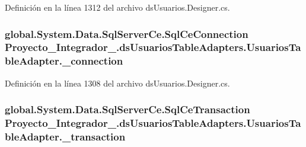 Definición en la línea 1312 del archivo ds\-Usuarios.\-Designer.\-cs.

\hypertarget{class_proyecto___integrador__3_1_1ds_usuarios_table_adapters_1_1_usuarios_table_adapter_a0250533a5325c3381c6c4e82d364aa9d}{
\subsubsection[{\-\_\-connection}]{\setlength{\rightskip}{0pt plus 5cm}global.\-System.\-Data.\-Sql\-Server\-Ce.\-Sql\-Ce\-Connection Proyecto\-\_\-\-Integrador\-\_.\-ds\-Usuarios\-Table\-Adapters.\-Usuarios\-Table\-Adapter.\-\_\-connection\hspace{0.3cm}{\ttfamily [private]}}}\label{class_proyecto___integrador__3_1_1ds_usuarios_table_adapters_1_1_usuarios_table_adapter_a0250533a5325c3381c6c4e82d364aa9d}


Definición en la línea 1308 del archivo ds\-Usuarios.\-Designer.\-cs.

\hypertarget{class_proyecto___integrador__3_1_1ds_usuarios_table_adapters_1_1_usuarios_table_adapter_a190d15c8d49c6f2014c79e83efc26011}{
\subsubsection[{\-\_\-transaction}]{\setlength{\rightskip}{0pt plus 5cm}global.\-System.\-Data.\-Sql\-Server\-Ce.\-Sql\-Ce\-Transaction Proyecto\-\_\-\-Integrador\-\_.\-ds\-Usuarios\-Table\-Adapters.\-Usuarios\-Table\-Adapter.\-\_\-transaction\hspace{0.3cm}{\ttfamily [private]}}}\label{class_proyecto___integrador__3_1_1ds_usuarios_table_adapters_1_1_usuarios_table_adapter_a190d15c8d49c6f2014c79e83efc26011}


